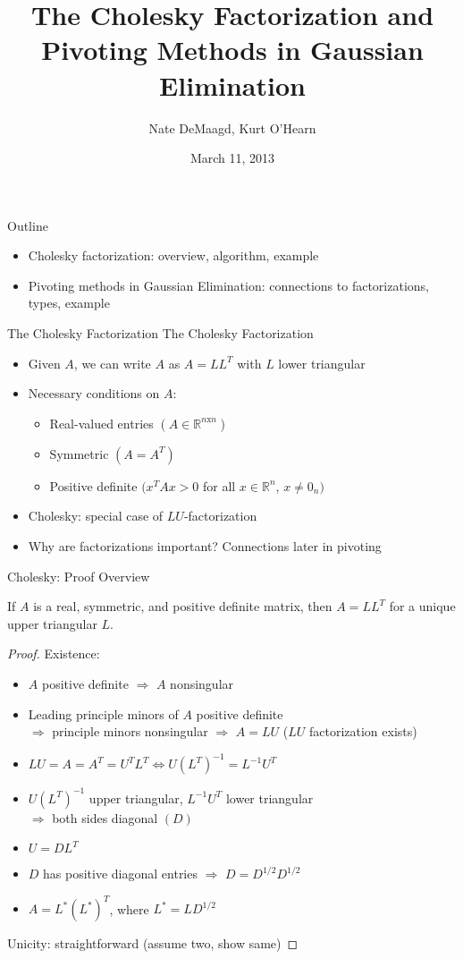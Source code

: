 \documentclass[9pt, serif]{beamer}
\title[Factorizations and Pivoting]
{The Cholesky Factorization and \\Pivoting Methods in Gaussian Elimination}
\author[]
{Nate DeMaagd, Kurt O'Hearn}
\institute[Grand Valley State University]
{MTH 499-02}
\date{March 11, 2013}
\newlength{\wideitemsep}
\let\olditem\item
\renewcommand{\item}{\setlength{\itemsep}{\wideitemsep}\olditem}
\newcommand{\bi}{\begin{itemize}}
\newcommand{\ei}{\end{itemize}}
\begin{document}
\begin{frame}
    \titlepage
\end{frame}

\begin{frame}{Outline}
    \bi
        \item Cholesky factorization: overview, algorithm, example \pause
        \item Pivoting methods in Gaussian Elimination: connections to factorizations, types, example
    \ei
\end{frame}

\begin{frame}{The Cholesky Factorization}
The Cholesky Factorization \pause
\bi
\item Given $A$, we can write $A$ as  $A=LL^T$ with $L$ lower triangular\pause
\item Necessary conditions on $A$:\pause
	\bi \item Real-valued entries $(A \in \mathbb{R}^{n\text{x}n})$
	\item Symmetric $(A = A^T)$
	\item Positive definite $(x^TAx > 0$ for all $x \in \mathbb{R}^n$, $x \ne 0_n)$ \pause
	\ei
\item Cholesky: special case of $LU$-factorization\pause
\item Why are factorizations important?  Connections later in pivoting \pause
\ei
\end{frame}


\begin{frame}{Cholesky: Proof Overview}
\begin{theorem}
	If $A$ is a real, symmetric, and positive definite matrix, then $A=LL^T$ for a unique upper triangular $L$. \pause
\end{theorem}
\begin{proof}
    Existence: \pause
    \bi 
    	\item $A$ positive definite $\Rightarrow$ $A$ nonsingular \pause 
		\item Leading principle minors of $A$ positive definite \\$\Rightarrow$ principle minors nonsingular $\Rightarrow$ $A=LU$ ($LU$ factorization exists) \pause
		\item $LU = A = A^T = U^TL^T \Leftrightarrow U(L^T)^{-1} = L^{-1}U^T$ \pause
		\item $U(L^T)^{-1}$ upper triangular, $L^{-1}U^T$ lower triangular \\$\Rightarrow$ both sides diagonal $(D)$ \pause
        \item $U=DL^T$ \pause
	    \item $D$ has positive diagonal entries $\Rightarrow$ $D = D^{1/2}D^{1/2}$ \pause
		\item $A = L^*(L^*)^T$, where $L^* = LD^{1/2}$
    \ei \pause
    Unicity: straightforward (assume two, show same)
\end{proof}
\end{frame}
\end{document}
